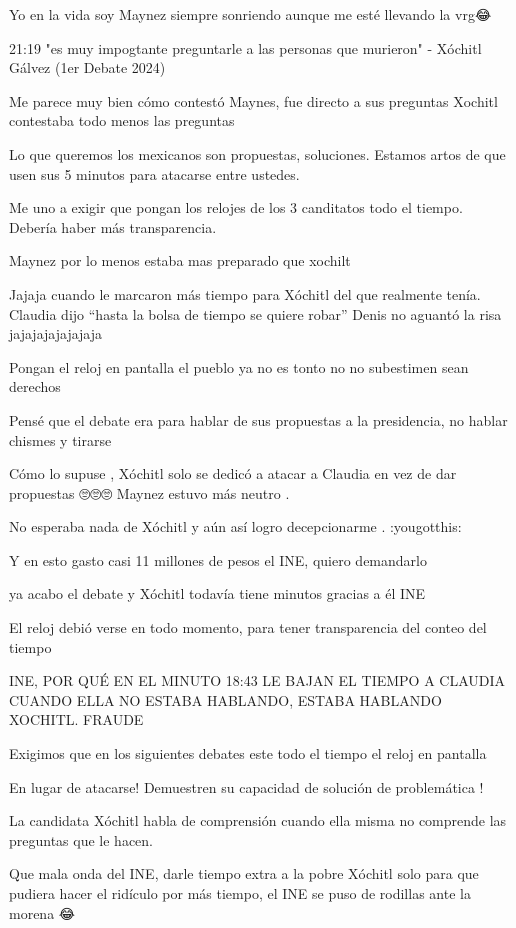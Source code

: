 Yo en la vida soy Maynez siempre sonriendo aunque me esté llevando la vrg😂

21:19  "es muy impogtante preguntarle a las personas que murieron" 
- Xóchitl Gálvez (1er Debate 2024)

Me parece muy bien cómo contestó Maynes, fue directo a sus preguntas 
Xochitl contestaba todo menos las preguntas

Lo que queremos los mexicanos son propuestas, soluciones. Estamos artos de que usen sus 5 minutos para atacarse entre ustedes.

Me uno a exigir que pongan los relojes de los 3 canditatos todo el tiempo. Debería haber más transparencia.

Maynez por lo menos estaba mas preparado que xochilt

Jajaja cuando le marcaron más tiempo para Xóchitl del que realmente tenía. Claudia dijo “hasta la bolsa de tiempo se quiere robar” Denis no aguantó la risa jajajajajajajaja

Pongan el reloj en pantalla el pueblo ya no es tonto no no subestimen sean derechos

Pensé que el debate era para hablar de sus propuestas a la presidencia, no hablar chismes y tirarse 💩

Cómo lo supuse , Xóchitl solo se dedicó a atacar a Claudia en vez de dar propuestas 🙄🙄🙄 Maynez estuvo más neutro .

No esperaba nada de Xóchitl y aún así logro decepcionarme . :yougotthis:

Y en esto gasto casi 11 millones de pesos el INE, quiero demandarlo

ya acabo el debate y Xóchitl todavía tiene minutos gracias a él INE 🫡

El reloj debió verse en todo momento, para tener transparencia del conteo del tiempo

INE, POR QUÉ EN EL MINUTO 18:43 LE BAJAN EL TIEMPO A CLAUDIA CUANDO ELLA NO ESTABA HABLANDO, ESTABA HABLANDO XOCHITL. FRAUDE

Exigimos que en los siguientes debates este todo el tiempo el reloj en pantalla

En lugar de atacarse! Demuestren su capacidad de solución de problemática !

La candidata Xóchitl habla de comprensión cuando ella misma no comprende las preguntas que le hacen.

Que mala onda del INE, darle tiempo extra a la pobre Xóchitl solo para que pudiera hacer el ridículo por más tiempo, el INE se puso de rodillas ante la morena 😂

